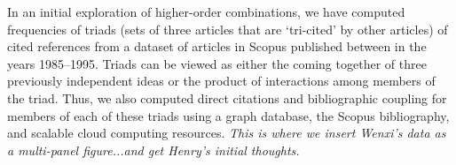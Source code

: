 \documentclass[notitlepage]{report}
\begin{document}
In an initial exploration of higher-order combinations, we have computed frequencies of triads (sets of three articles that are `tri-cited' by other articles) of cited references from a dataset of articles in Scopus published between in the years 1985--1995. Triads can be viewed as either the coming together of three previously independent ideas or the product of interactions among members of the triad. Thus, we also computed direct citations and bibliographic coupling for members of each of these triads using a graph database, the Scopus bibliography, and scalable cloud computing resources. \emph{This is where we insert Wenxi's data as a multi-panel figure...and get Henry's initial thoughts.}
\end{document}
